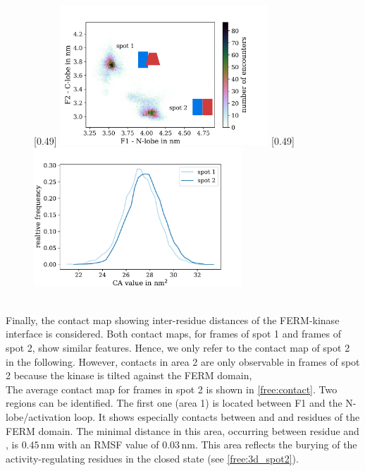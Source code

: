 \begin{figure}
	\subcaptionbox{\label{free:f2clf1nl}}[0.49\textwidth]{
		\includegraphics[height=5.2cm]{figures/results/free_f1f2_withcartoons}
	}\hfill%
	\subcaptionbox{\label{free:ca}}[0.49\textwidth]{
		\includegraphics[height=5.2cm]{figures/results/free_ca}
	}%
	\label{free:pic_ca_and_com}
\end{figure}
%
%
%
\\
Finally, the contact map showing inter-residue distances of the FERM-kinase interface is considered. Both contact maps, for frames of spot 1 and frames of spot 2, show similar features. Hence, we only refer to the contact map of spot 2 in the following. However, contacts in area 2 are only observable in frames of spot 2 because the kinase is tilted against the FERM domain, \\
The average contact map for frames in spot 2 is shown in \autoref{free:contact}. Two regions can be identified. The first one (area 1) is located between F1 and the N-lobe/activation loop. It shows especially contacts between  and  and residues of the FERM domain. The minimal distance in this area, occurring between residue  and , is $0.45\,\si{\nano\metre}$ with an RMSF value of $0.03\,\si{\nano\metre}$. This area reflects the burying of the activity-regulating residues in the closed state (see \autoref{free:3d_spot2}).\\
